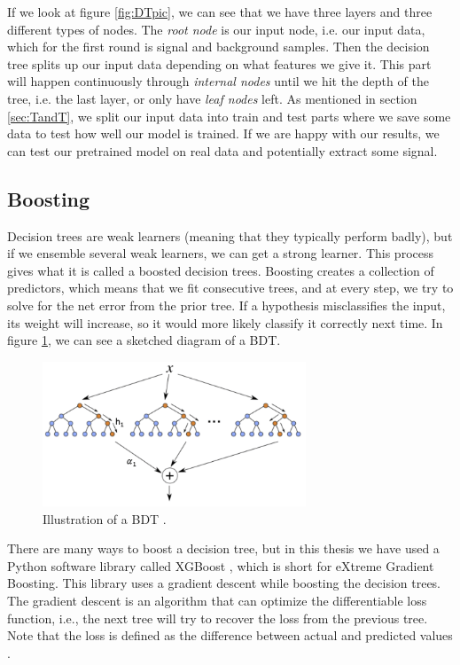 If we look at figure \ref{fig:DTpic}, we can see that we have three layers and three different types of nodes. The \textit{root node} is our input node, i.e. our input data, which for the first round is signal and background samples. Then the decision tree splits up our input data depending on what features we give it. This part will happen continuously through \textit{internal nodes} until we hit the depth of the tree, i.e. the last layer, or only have \textit{leaf nodes} left. As mentioned in section \ref{sec:TandT}, we split our input data into train and test parts where we save some data to test how well our model is trained. If we are happy with our results, we can test our pretrained model on real data and potentially extract some signal.


\subsection{Boosting}
Decision trees are weak learners (meaning that they typically perform badly), but if we ensemble several weak learners, we can get a strong learner. This process gives what it is called a boosted decision trees. Boosting creates a collection of predictors, which means that we fit consecutive trees, and at every step, we try to solve for the net error from the prior tree. If a hypothesis misclassifies the input, its weight will increase, so it would more likely classify it correctly next time. In figure \ref{fig:BDT}, we can see a sketched diagram of a BDT.


\begin{figure}[H]
    \centering
    \includegraphics[width = 0.7\textwidth]{Figures/FromOnline/BDT.png}
    \caption{Illustration of a BDT \cite{BDTpic}.}
    \label{fig:BDT}
\end{figure}

There are many ways to boost a decision tree, but in this thesis we have used a Python software library called XGBoost \cite{xgboostAbout}, which is short for eXtreme Gradient Boosting. This library uses a gradient descent while boosting the decision trees. The gradient descent is an algorithm that can optimize the differentiable loss function, i.e., the next tree will try to recover the loss from the previous tree. Note that the loss is defined as the difference between actual and predicted values \cite{BDT}. 

